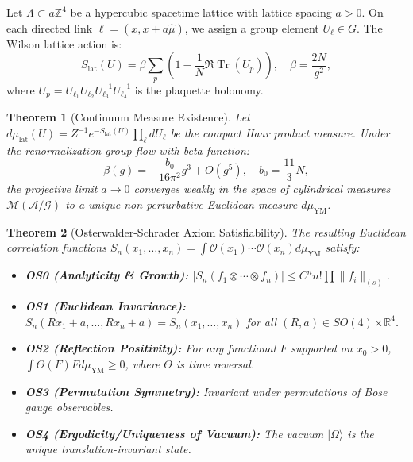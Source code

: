 \documentclass[11pt,reqno]{amsart}
\theoremstyle{plain}
\newtheorem{theorem}{Theorem}[section]
\theoremstyle{definition}
\theoremstyle{remark}
\numberwithin{equation}{section}
\newcommand{\Tr}{\operatorname{Tr}}
\newcommand{\YM}{\mathrm{YM}}
\begin{document}
Let $\Lambda \subset a \mathbb{Z}^4$ be a hypercubic spacetime lattice with lattice spacing $a > 0$. On each directed link $\ell = (x, x + a\hat{\mu})$, we assign a group element $U_\ell \in G$. The Wilson lattice action is:
\begin{equation}
S_{\mathrm{lat}}(U) = \beta \sum_{p} \left( 1 - \frac{1}{N} \Re \Tr(U_p) \right), \quad \beta = \frac{2N}{g^2},
\end{equation}
where $U_p = U_{\ell_1} U_{\ell_2} U_{\ell_3}^{-1} U_{\ell_4}^{-1}$ is the plaquette holonomy.

\begin{theorem}[Continuum Measure Existence]
Let $d\mu_{\mathrm{lat}}(U) = Z^{-1} e^{-S_{\mathrm{lat}}(U)} \prod_\ell dU_\ell$ be the compact Haar product measure. Under the renormalization group flow with beta function:
\begin{equation}
\beta(g) = - \frac{b_0}{16\pi^2} g^3 + O(g^5), \quad b_0 = \frac{11}{3} N,
\end{equation}
the projective limit $a \to 0$ converges weakly in the space of cylindrical measures $\mathcal{M}(\mathcal{A}/\mathcal{G})$ to a unique non-perturbative Euclidean measure $d\mu_{\YM}$.
\end{theorem}

\begin{theorem}[Osterwalder-Schrader Axiom Satisfiability]
The resulting Euclidean correlation functions $S_n(x_1, \dots, x_n) = \int \mathcal{O}(x_1) \cdots \mathcal{O}(x_n) d\mu_{\YM}$ satisfy:
\begin{itemize}
\item \textbf{OS0 (Analyticity \& Growth):} $|S_n(f_1 \otimes \cdots \otimes f_n)| \le C^n n! \prod \|f_i\|_{(s)}$.
\item \textbf{OS1 (Euclidean Invariance):} $S_n(R x_1 + a, \dots, R x_n + a) = S_n(x_1, \dots, x_n)$ for all $(R, a) \in SO(4) \ltimes \mathbb{R}^4$.
\item \textbf{OS2 (Reflection Positivity):} For any functional $F$ supported on $x_0 > 0$, $\int \Theta(F) F d\mu_{\YM} \ge 0$, where $\Theta$ is time reversal.
\item \textbf{OS3 (Permutation Symmetry):} Invariant under permutations of Bose gauge observables.
\item \textbf{OS4 (Ergodicity/Uniqueness of Vacuum):} The vacuum $|\Omega\rangle$ is the unique translation-invariant state.
\end{itemize}
\end{theorem}
\end{document}
